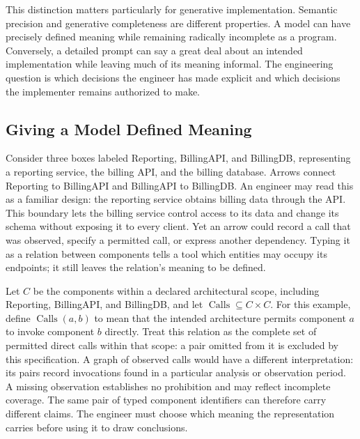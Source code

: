 
This distinction matters particularly for generative implementation. Semantic precision and generative completeness are different properties. A model can have precisely defined meaning while remaining radically incomplete as a program. Conversely, a detailed prompt can say a great deal about an intended implementation while leaving much of its meaning informal. The engineering question is which decisions the engineer has made explicit and which decisions the implementer remains authorized to make.

\subsection{Giving a Model Defined Meaning}\label{heading:giving-a-model-defined-meaning}



Consider three boxes labeled Reporting, BillingAPI, and BillingDB, representing a reporting service, the billing API, and the billing database. Arrows connect Reporting to BillingAPI and BillingAPI to BillingDB. An engineer may read this as a familiar design: the reporting service obtains billing data through the API. This boundary lets the billing service control access to its data and change its schema without exposing it to every client. Yet an arrow could record a call that was observed, specify a permitted call, or express another dependency. Typing it as a relation between components tells a tool which entities may occupy its endpoints; it still leaves the relation's meaning to be defined.

Let \(C\) be the components within a declared architectural scope, including Reporting, BillingAPI, and BillingDB, and let \(\operatorname{Calls}\subseteq C\times C\). For this example, define \(\operatorname{Calls}(a,b)\) to mean that the intended architecture permits component \(a\) to invoke component \(b\) directly. Treat this relation as the complete set of permitted direct calls within that scope: a pair omitted from it is excluded by this specification. A graph of observed calls would have a different interpretation: its pairs record invocations found in a particular analysis or observation period. A missing observation establishes no prohibition and may reflect incomplete coverage. The same pair of typed component identifiers can therefore carry different claims. The engineer must choose which meaning the representation carries before using it to draw conclusions.


